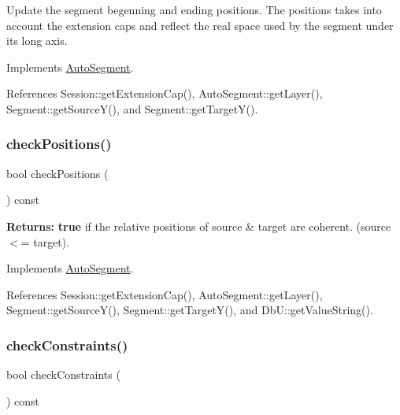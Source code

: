 Update the segment begenning and ending positions. The positions takes into account the extension caps and reflect the real space used by the segment under it\textquotesingle{}s long axis. 

Implements \hyperlink{classKatabatic_1_1AutoSegment_a6d95f4de39c13611786c95ddc7b8942e}{Auto\+Segment}.



References Session\+::get\+Extension\+Cap(), Auto\+Segment\+::get\+Layer(), Segment\+::get\+Source\+Y(), and Segment\+::get\+Target\+Y().

\mbox{\label{classKatabatic_1_1AutoVertical_a6575c17bfa589c087215c87678e5719c}} 
\subsubsection{\texorpdfstring{check\+Positions()}{checkPositions()}}
{\footnotesize\ttfamily bool check\+Positions (\begin{DoxyParamCaption}{ }\end{DoxyParamCaption}) const\hspace{0.3cm}{\ttfamily [virtual]}}

{\bfseries Returns\+:} {\bfseries true} if the relative positions of source \& target are coherent. (source $<$= target). 

Implements \hyperlink{classKatabatic_1_1AutoSegment_af026a81002bd907f1ccd4a4784aaa1db}{Auto\+Segment}.



References Session\+::get\+Extension\+Cap(), Auto\+Segment\+::get\+Layer(), Segment\+::get\+Source\+Y(), Segment\+::get\+Target\+Y(), and Db\+U\+::get\+Value\+String().

\mbox{\label{classKatabatic_1_1AutoVertical_a8aef8f4bbafe3426840f9ebf31bb3b81}} 
\subsubsection{\texorpdfstring{check\+Constraints()}{checkConstraints()}}
{\footnotesize\ttfamily bool check\+Constraints (\begin{DoxyParamCaption}{ }\end{DoxyParamCaption}) const\hspace{0.3cm}{\ttfamily [virtual]}}

